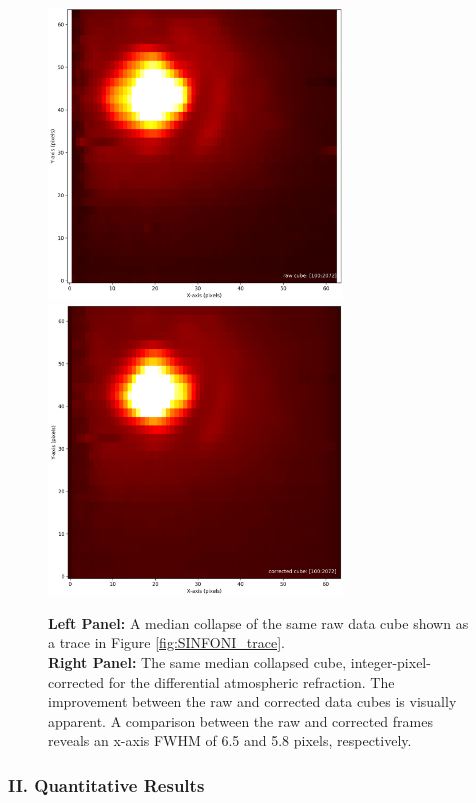 \begin{figure}[H]
\centering \subfigure
\includegraphics[width=7.8cm]{figures/SINFO_2015-02-18T07:53_Telluric_Standard_COADD_STD_H+K_0_025_full_median_collapsed_cube.png} 
\includegraphics[width=7.8cm]{figures/SINFO_2015-02-18T07:53_Telluric_Standard_COADD_STD_H+K_0_025_full_median_corrected_cube.png} 
\caption[]
	{\footnotesize  {\bf Left Panel:}  A median collapse of the same raw data cube shown as a trace in Figure \ref{fig:SINFONI_trace}. \\
	{\bf Right Panel:}  The same median collapsed cube, integer-pixel-corrected for the differential atmospheric refraction.   The improvement between the raw 
	and corrected data cubes is visually apparent.  A comparison between the raw and corrected frames reveals an x-axis FWHM of
	6.5 and 5.8 pixels, respectively.
	}
	\label{fig:SINFONI_image}
\end{figure}

\subsubsection{II.  Quantitative Results}

